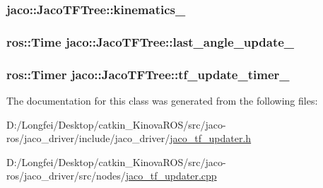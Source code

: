 \subsubsection[{\texorpdfstring{kinematics\+\_\+}{kinematics_}}]{ jaco\+::\+Jaco\+T\+F\+Tree\+::kinematics\+\_\+\hspace{0.3cm}{\ttfamily [private]}}\hypertarget{classjaco_1_1JacoTFTree_aacb83b30f56868891d78852834ef0532}{}\label{classjaco_1_1JacoTFTree_aacb83b30f56868891d78852834ef0532}
\subsubsection[{\texorpdfstring{last\+\_\+angle\+\_\+update\+\_\+}{last_angle_update_}}]{\setlength{\rightskip}{0pt plus 5cm}ros\+::\+Time jaco\+::\+Jaco\+T\+F\+Tree\+::last\+\_\+angle\+\_\+update\+\_\+\hspace{0.3cm}{\ttfamily [private]}}\hypertarget{classjaco_1_1JacoTFTree_a20869124ed9dd0b936d79d5d8a60b6db}{}\label{classjaco_1_1JacoTFTree_a20869124ed9dd0b936d79d5d8a60b6db}
\subsubsection[{\texorpdfstring{tf\+\_\+update\+\_\+timer\+\_\+}{tf_update_timer_}}]{\setlength{\rightskip}{0pt plus 5cm}ros\+::\+Timer jaco\+::\+Jaco\+T\+F\+Tree\+::tf\+\_\+update\+\_\+timer\+\_\+\hspace{0.3cm}{\ttfamily [private]}}\hypertarget{classjaco_1_1JacoTFTree_a1470ccde41ff4213c92b4e7ecbcad3e3}{}\label{classjaco_1_1JacoTFTree_a1470ccde41ff4213c92b4e7ecbcad3e3}


The documentation for this class was generated from the following files\+:\begin{DoxyCompactItemize}
\item 
D\+:/\+Longfei/\+Desktop/catkin\+\_\+\+Kinova\+R\+O\+S/src/jaco-\/ros/jaco\+\_\+driver/include/jaco\+\_\+driver/\hyperlink{jaco__tf__updater_8h}{jaco\+\_\+tf\+\_\+updater.\+h}\item 
D\+:/\+Longfei/\+Desktop/catkin\+\_\+\+Kinova\+R\+O\+S/src/jaco-\/ros/jaco\+\_\+driver/src/nodes/\hyperlink{jaco__tf__updater_8cpp}{jaco\+\_\+tf\+\_\+updater.\+cpp}\end{DoxyCompactItemize}
